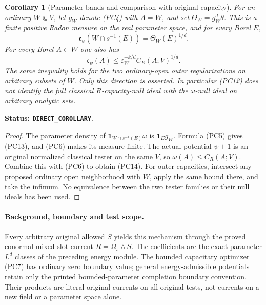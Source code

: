 \documentclass[11pt,a4paper]{article}
\numberwithin{equation}{section}
\newtheorem{corollary}[theorem]{Corollary}
\theoremstyle{definition}
\theoremstyle{remark}
\begin{document}
\begin{corollary}[Parameter bands and comparison with original capacity]
\label{cor:r12-parameter-energy-capacity-bands}
For an ordinary $W\Subset V$, let $g_W$ denote (PC4) with
$A=W$, and set $\Theta_W=g_W^d\theta$. This is a finite positive
Radon measure on the real parameter space, and for every Borel $E$,
\[
         \mathfrak c_\psi(W\cap s^{-1}(E))=\Theta_W(E)^{1/d}.
                                                                    \tag{PC13}
\]
For every Borel $A\subset W$ one also has
\[
          \mathfrak c_\psi(A)
               \le\varepsilon_W^{-k/d} C_R(A;V)^{1/d}.
                                                                    \tag{PC14}
\]
The same inequality holds for the two ordinary-open outer
regularizations on arbitrary subsets of $W$. Only this direction
is asserted. In particular (PC12) does not identify the full
classical $R$-capacity-null ideal with the $\omega$-null ideal
on arbitrary analytic sets.
\end{corollary}

\noindent\textbf{Status: \texttt{DIRECT\_COROLLARY}}.

\begin{proof}
The parameter density of $\mathbf1_{W\cap s^{-1}(E)}\omega$
is $\mathbf1_Eg_W$. Formula (PC5) gives (PC13), and (PC6)
makes its measure finite. The actual potential $\psi+1$ is
an original normalized classical tester on the same $V$, so
$\omega(A)\le C_R(A;V)$. Combine this with (PC6) to obtain
(PC14). For outer capacities, intersect any proposed ordinary
open neighborhood with $W$, apply the same bound there, and
take the infimum. No equivalence between the two tester
families or their null ideals has been used.
\end{proof}

\paragraph{Background, boundary and test scope.}
Every arbitrary original allowed $S$ yields this mechanism
through the proved conormal mixed-slot current
$R=\Omega_s\wedge S$. The coefficients are the exact
parameter $L^d$ classes of the preceding energy module.
The bounded capacitary optimizer (PC7) has ordinary zero
boundary value; general energy-admissible potentials retain
only the printed bounded-parameter completion boundary convention.
Their products are literal original currents on all original
tests, not currents on a new field or a parameter space alone.
\end{document}
